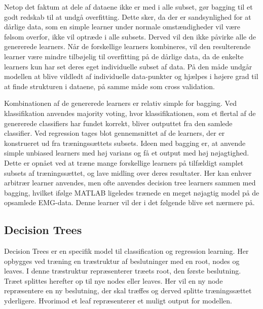 Netop det faktum at dele af dataene ikke er med i alle subset, gør bagging til et godt redskab til at undgå overfitting. Dette sker, da der er sandsynlighed for at dårlige data, som en simple learner under normale omstændigheder vil være følsom overfor, ikke vil optræde i alle subsets. Derved vil den ikke påvirke alle de genererede learners. Når de forskellige learners kombineres, vil den resulterende learner være mindre tilbøjelig til overfitting på de dårlige data, da de enkelte learners kun har set deres eget individuelle subset af data. På den måde undgår modellen at blive vildledt af individuelle data-punkter og hjælpes i højere grad til at finde strukturen i dataene, på samme måde som cross validation.

Kombinationen af de genererede learners er relativ simple for bagging. Ved klassifikation anvendes majority voting, hvor klassifikationen, som et flertal af de genererede classifiers har fundet korrekt, bliver outputtet fra den samlede classifier.
Ved regression tages blot gennemsnittet af de learners, der er konstrueret ud fra træningssættets subsets. Ideen med bagging er, at anvende simple unbiased learners med høj varians og få et output med høj nøjagtighed. Dette er opnået ved at træne mange forskellige learners på tilfældigt samplet subsets af træningssættet, og lave midling over deres resultater. Her kan enhver arbitrær learner anvendes, men ofte anvendes decision tree learners sammen med bagging, hvilket ifølge MATLAB ligeledes trænede en meget nøjagtig model på de opsamlede EMG-data. Denne learner vil der i det følgende blive set nærmere på.\citep{bagging}

\subsection{Decision Trees}
Decision Trees er en specifik model til classification og regression learning. Her opbygges ved træning en træstruktur af beslutninger med en root, nodes og leaves. I denne træstruktur repræsenterer træets root, den første beslutning. Træet splittes herefter op til nye nodes eller leaves. Her vil en ny node repræsentere en ny beslutning, der skal træffes og derved splitte træningssættet yderligere. Hvorimod et leaf repræsenterer et muligt output for modellen. 


